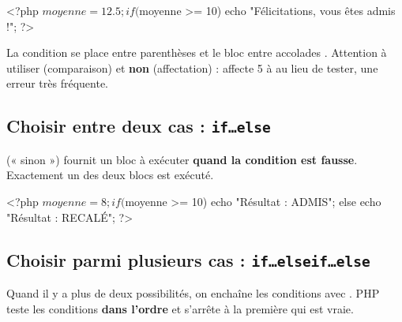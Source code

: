 \begin{syntaxe}
\end{syntaxe}

\begin{codephp}
<?php
  $moyenne = 12.5;
  if ($moyenne >= 10) {
    echo "Félicitations, vous êtes admis !";
  }
?>
\end{codephp}


\begin{attention}
La condition se place entre parenthèses \code{( )} et le bloc entre accolades
\code{\{ \}}. Attention à utiliser \code{==} (comparaison) et \textbf{non} \code{=}
(affectation) :  affecte 5 à  au lieu de tester, une
erreur très fréquente.
\end{attention}

\subsection{Choisir entre deux cas : \texttt{if…else}}

\begin{definition}
 (« sinon ») fournit un bloc à exécuter \textbf{quand la condition est
fausse}. Exactement un des deux blocs est exécuté.
\end{definition}

\begin{codephp}
<?php
  $moyenne = 8;
  if ($moyenne >= 10) {
    echo "Résultat : ADMIS";
  } else {
    echo "Résultat : RECALÉ";
  }
?>
\end{codephp}

\subsection{Choisir parmi plusieurs cas : \texttt{if…elseif…else}}

Quand il y a plus de deux possibilités, on enchaîne les conditions avec
. PHP teste les conditions \textbf{dans l'ordre} et s'arrête à la
première qui est vraie.


